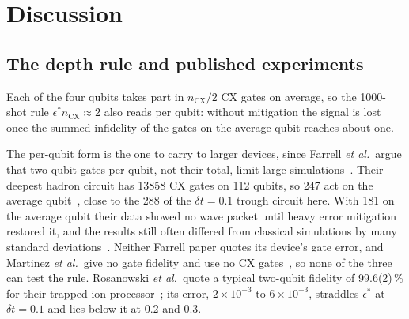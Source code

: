 \section{Discussion}
\label{sec:discussion}

\subsection{The depth rule and published experiments}

Each of the four qubits takes part in $n_{\mathrm{CX}}/2$ CX gates on average,
so the 1000-shot rule $\epsilon^\ast n_{\mathrm{CX}} \approx 2$ also reads per
qubit: without mitigation the signal is lost once the summed infidelity of the
gates on the average qubit reaches about one.

The per-qubit form is the one to carry to larger devices, since Farrell
\emph{et al.}\ argue that two-qubit gates per qubit, not their total, limit
large simulations~\cite{farrell2024}. Their deepest hadron circuit has
\num{13858} CX gates on 112 qubits, so 247 act on the average
qubit~\cite{farrell2024b}, close to the 288 of the $\delta t = 0.1$ trough
circuit here. With 181 on the average qubit their data showed no wave packet
until heavy error mitigation restored it, and the results still often differed from classical
simulations by many standard deviations~\cite{farrell2024b}. Neither Farrell
paper quotes its device's gate error, and Martinez \emph{et al.}\ give no gate
fidelity and use no CX gates~\cite{martinez2016}, so none of the three can test
the rule. Rosanowski \emph{et al.}\ quote a typical two-qubit fidelity of
99.6(2)\,\% for their trapped-ion processor~\cite{rosanowski2025}; its error,
$2\times10^{-3}$ to $6\times10^{-3}$, straddles $\epsilon^\ast$ at
$\delta t = 0.1$ and lies below it at 0.2 and 0.3.

